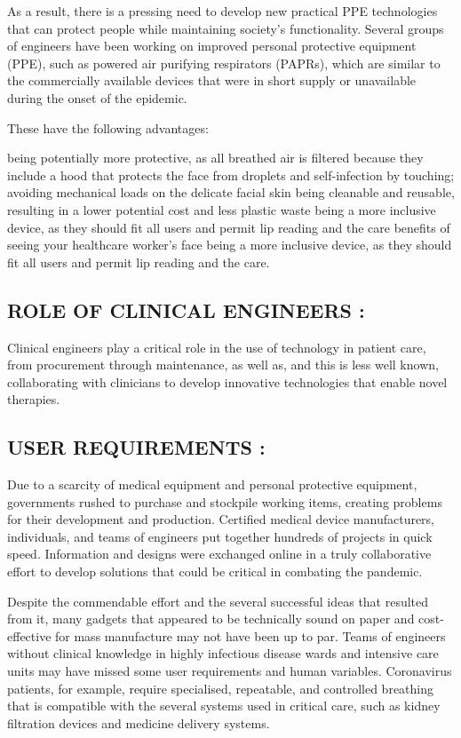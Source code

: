 \documentclass[12pt]{article}
\begin{document}
 As a result, there is a pressing need to develop new practical PPE technologies that can protect people while maintaining society's functionality. Several groups of engineers have been working on improved personal protective equipment (PPE), such as powered air purifying respirators (PAPRs), which are similar to the commercially available devices that were in short supply or unavailable during the onset of the epidemic.
 
 
 
 These have the following advantages:

being potentially more protective, as all breathed air is filtered because they include a hood that protects the face from droplets and self-infection by touching; avoiding mechanical loads on the delicate facial skin being cleanable and reusable, resulting in a lower potential cost and less plastic waste being a more inclusive device, as they should fit all users and permit lip reading and the care benefits of seeing your healthcare worker's face being a more inclusive device, as they should fit all users and permit lip reading and the care.


\subsection{ROLE OF CLINICAL ENGINEERS :}

Clinical engineers play a critical role in the use of technology in patient care, from procurement through maintenance, as well as, and this is less well known, collaborating with clinicians to develop innovative technologies that enable novel therapies.

\subsection{USER REQUIREMENTS :}

Due to a scarcity of medical equipment and personal protective equipment, governments rushed to purchase and stockpile working items, creating problems for their development and production. Certified medical device manufacturers, individuals, and teams of engineers put together hundreds of projects in quick speed. Information and designs were exchanged online in a truly collaborative effort to develop solutions that could be critical in combating the pandemic.



Despite the commendable effort and the several successful ideas that resulted from it, many gadgets that appeared to be technically sound on paper and cost-effective for mass manufacture may not have been up to par. Teams of engineers without clinical knowledge in highly infectious disease wards and intensive care units may have missed some user requirements and human variables. Coronavirus patients, for example, require specialised, repeatable, and controlled breathing that is compatible with the several systems used in critical care, such as kidney filtration devices and medicine delivery systems.
\end{document}
